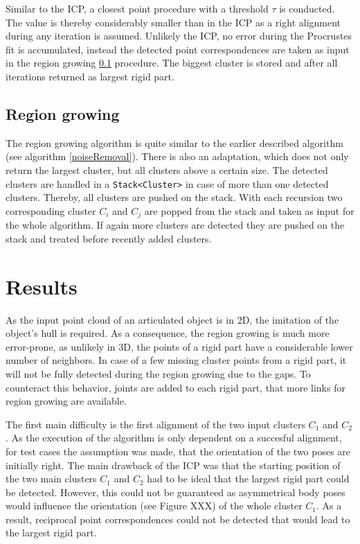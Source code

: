 Similar to the ICP, a closest point procedure with a threshold $\tau$ is conducted. The value is thereby considerably smaller than in the ICP as a right alignment during any iteration is assumed. Unlikely the ICP, no error during the Procrustes fit is accumulated, instead the detected point correspondences are taken as input in the region growing \ref{RegionGrowing} procedure. The biggest cluster is stored and after all iterations returned as largest rigid part.

\subsection{Region growing}
\label{RegionGrowing}
The region growing algorithm is quite similar to the earlier described algorithm (see algorithm \ref{noiseRemoval}). There is also an adaptation, which does not only return the largest cluster, but all clusters above a certain size. The detected clusters are handled in a \texttt{Stack<Cluster>} in case of more than one detected clusters. Thereby, all clusters are pushed on the stack. With each recursion two corresponding cluster $C_i$ and $C_j$ are popped from the stack and taken as input for the whole algorithm. If again more clusters are detected they are pushed on the stack and treated before recently added clusters.

\section{Results}
\label{ResultsLRP}

As the input point cloud of an articulated object is in 2D, the imitation of the object's hull is required. As a consequence, the region growing is much more error-prone, as unlikely in 3D, the points of a rigid part have a considerable lower number of neighbors. In case of a few missing cluster points from a rigid part, it will not be fully detected during the region growing due to the gaps. To counteract this behavior, joints are added to each rigid part, that more links for region growing are available. 


The first main difficulty is the first alignment of the two input clusters $C_1$ and $C_2$. As the execution of the algorithm is only dependent on a succesful alignment, for test cases the assumption was made, that the orientation of the two poses are initially right. The main drawback of the ICP was that the starting position of the two main clusters $C_1$ and $C_2$ had to be ideal that the largest rigid part could be detected. However, this could not be guaranteed as asymmetrical body poses would influence the orientation (see Figure XXX) of the whole cluster $C_1$. As a result, reciprocal point correspondences could not be detected that would lead to the largest rigid part.

